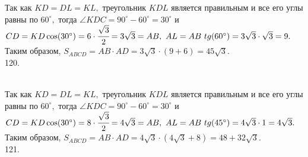 \documentclass[12pt]{article}
\begin{document}
Так как $KD=DL=KL,$ треугольник $KDL$ является правильным и все его углы равны по $60^\circ,$ тогда $\angle KDC=90^\circ-60^\circ=30^\circ$ и $CD=KD\cos(30^\circ)=6\cdot\cfrac{\sqrt{3}}{2}=3\sqrt{3}=AB,\ AL=AB\ tg(60^\circ)=3\sqrt{3}\cdot\sqrt{3}=9.$ Таким образом, $S_{ABCD}=AB\cdot AD=3\sqrt{3}\cdot(9+6)=45\sqrt{3}.$\\
120. \begin{figure}[ht!]
\end{figure}\\
Так как $KD=DL=KL,$ треугольник $KDL$ является правильным и все его углы равны по $60^\circ,$ тогда $\angle KDC=90^\circ-60^\circ=30^\circ$ и $CD=KD\cos(30^\circ)=8\cdot\cfrac{\sqrt{3}}{2}=4\sqrt{3}=AB,\ AL=AB\ tg(45^\circ)=4\sqrt{3}\cdot1=4\sqrt{3}.$ Таким образом, $S_{ABCD}=AB\cdot AD=4\sqrt{3}\cdot(4\sqrt{3}+8)=48+32\sqrt{3}.$\\
121.\begin{figure}[ht!]
\end{figure}\\
\end{document}
